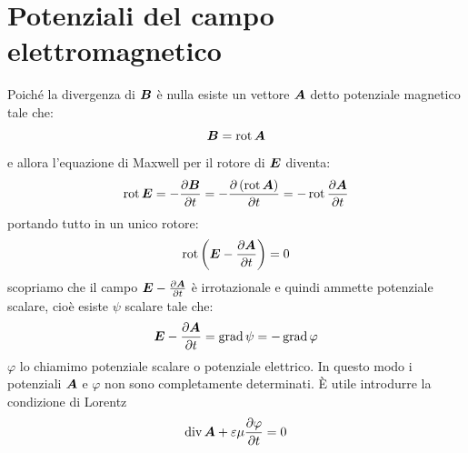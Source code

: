 \section{Potenziali del campo elettromagnetico}
Poiché la divergenza di $\boldsymbol{B}$ è nulla esiste un vettore $\boldsymbol{A}$ detto potenziale magnetico tale che:
\begin{equation}
\boldsymbol{B}=\operatorname{rot}\boldsymbol{A}
\label{ppp02}
\end{equation}
e allora l'equazione di Maxwell per il rotore di $\boldsymbol{E}$ diventa:
\begin{equation}
\operatorname{rot}\boldsymbol{E}=-\frac{\partial\boldsymbol{B}}{\partial t}=-\frac{\partial\left(\operatorname{rot}\boldsymbol{A}\right)}{\partial t}=-\operatorname{rot}\frac{\partial\boldsymbol{A}}{\partial t}
\end{equation}
portando tutto in un unico rotore:
\begin{equation}
\operatorname{rot}\left(\boldsymbol{E}-\frac{\partial \boldsymbol{A}}{\partial t}\right)=0
\end{equation}
scopriamo che il campo $\boldsymbol{E}-\frac{\partial \boldsymbol{A}}{\partial t}$ è irrotazionale e quindi ammette potenziale scalare, cioè esiste $\psi$ scalare tale che:
\begin{equation}
\boldsymbol{E}-\frac{\partial \boldsymbol{A}}{\partial t}=\operatorname{grad}\psi=-\operatorname{grad}\varphi
\label{ppp01}
\end{equation}
$\varphi$ lo chiamimo potenziale scalare o potenziale elettrico. In questo modo i potenziali $\boldsymbol{A}$ e $\varphi$ non sono completamente determinati. \`E utile introdurre la condizione di Lorentz
\begin{equation}
\operatorname{div}\boldsymbol{A}+\varepsilon\mu\frac{\partial\varphi}{\partial t}=0
\label{Lo10}
\end{equation}
